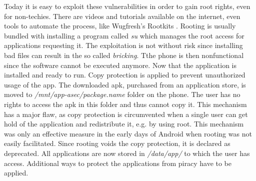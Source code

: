 Today it is easy to exploit these vulnerabilities in order to gain root rights, even for non-techies.
There are videos and tutorials available on the internet, even tools to automate the process, like Wugfresh's Rootkits \cite{wugfresh}.
Rooting is usually bundled with installing a program called \textit{su} which manages the root access for applications requesting it.
The exploitation is not without risk since installing bad files can result in the so called \textit{bricking}.
Tthe phone is then nonfunctional since the software cannot be executed anymore.
 \cite{androidpoliceRoot}
\newline
Now that the application is installed and ready to run.
Copy protection is applied to prevent unauthorized usage of the app.
The downloaded \gls{apk}, purchased from an application store, is moved to \textit{/mnt/app-asec/package.name} folder on the phone.
The user has no rights to access the \gls{apk} in this folder and thus cannot copy it.
This mechanism has a major flaw, as copy protection is circumvented when a single user can get hold of the application and redistribute it, e.g. by using root.
This mechanism was only an effective measure in the early days of Android when rooting was not easily facilitated.
\newline
Since rooting voids the copy protection, it is declared as deprecated.
All applications are now stored in \textit{/data/app/} to which the user has access.
Additional ways to protect the applications from piracy have to be applied.
